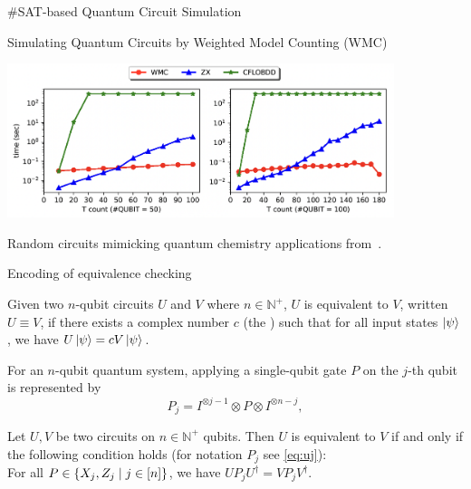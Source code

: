 \begin{refframe}{\#SAT-based Quantum Circuit Simulation}

Simulating Quantum Circuits by Weighted Model Counting (WMC) \cite{mei2024simulating}

\includegraphics[height=4.5cm]{graphics/random-quokka}

Random circuits mimicking quantum chemistry applications from~\cite{kissinger_simulating_2022}.


\end{refframe}






\begin{refframe}{Encoding of equivalence checking}

\begin{definition}
    Given two $n$-qubit circuits $U$ and $V$ where $n\in \mathbb{N}^+$,
    $U$ is equivalent to $V$, written $U\equiv V$, if there exists a complex number $c$ (the ) such that for all input states $\ket{\psi}$, we have $U\ket{\psi} = cV\ket{\psi}$.
\end{definition}


\pause

    For an $n$-qubit quantum system, applying a single-qubit gate $P$ on the $j$-th qubit is 
 represented by 
 \begin{equation}
     P_j = I^{\otimes j -1}\otimes P \otimes I^{\otimes n- j},
     \label{eq:uj}\end{equation}

\pause

    \begin{theorem}\label{thm:main-theorem}
        Let $U, V$ be two circuits on $n \in \mathbb{N}^{+}$ qubits.
        Then $U$ is equivalent to $V$ if and only if the following condition holds (for notation $P_j$ see \autoref{eq:uj}):\\
        For all $P \in \left\lbrace X_j, Z_j \mid j\in [n] \right\rbrace$, we have $U P_j U^{\dagger} = V P_j V^{\dagger}$.
    \end{theorem}

\end{refframe}


